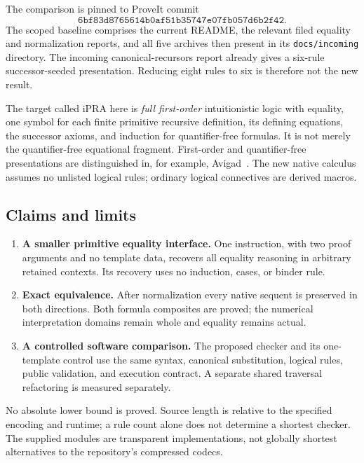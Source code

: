 \documentclass[11pt,a4paper]{article}
\theoremstyle{definition}
\begin{document}
The comparison is pinned to ProveIt commit
\[
\texttt{6bf83d8765614b0af51b35747e07fb057d6b2f42}.
\]
The scoped baseline comprises the current
 README, the
relevant filed equality and normalization reports, and all five archives
then present in its \texttt{docs/incoming} directory.
The incoming canonical-recursors report already gives a six-rule
successor-seeded presentation. Reducing eight rules to six is therefore
not the new result.

The target called iPRA here is \emph{full first-order} intuitionistic
logic with equality, one symbol for each finite primitive recursive
definition, its defining equations, the successor axioms, and induction
for quantifier-free formulas. It is not merely the quantifier-free
equational fragment. First-order and quantifier-free presentations are
distinguished in, for example, Avigad~\cite{avigad}. The new native
calculus assumes no unlisted logical rules; ordinary logical connectives
are derived macros.

\subsection{Claims and limits}

\begin{enumerate}
\item \textbf{A smaller primitive equality interface.}
One instruction, with two proof arguments and no template data, recovers
all equality reasoning in arbitrary retained contexts. Its recovery
uses no induction, cases, or binder rule.
\item \textbf{Exact equivalence.}
After normalization every native sequent is preserved in both
directions. Both formula composites are proved; the numerical
interpretation domains remain whole and equality remains actual.
\item \textbf{A controlled software comparison.}
The proposed checker and its one-template control use the same syntax,
canonical substitution, logical rules, public validation, and execution
contract. A separate shared traversal refactoring is measured separately.
\end{enumerate}

No absolute lower bound is proved. Source length is relative to the
specified encoding and runtime; a rule count alone does not determine
a shortest checker. The supplied modules are transparent implementations,
not globally shortest alternatives to the repository's compressed codecs.
\end{document}
